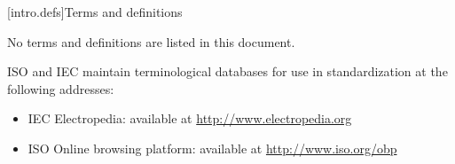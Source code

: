 
[intro.defs]{Terms and definitions}

\setcounter{section}{1}
\setcounter{tocdepth}{0}

\setcounter{tocdepth}{1}

No terms and definitions are listed in this document.

ISO and IEC maintain terminological databases for use in standardization at 
the following addresses:
\begin{itemize}
\item IEC Electropedia: available at \url{http://www.electropedia.org}
\item ISO Online browsing platform: available at \url{http://www.iso.org/obp}
\end{itemize}


